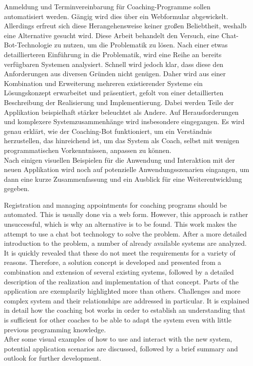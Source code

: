 \kurzfassung

Anmeldung und Terminvereinbarung für Coaching-Programme sollen automatisiert werden. Gängig wird dies über ein Webformular abgewickelt. Allerdings erfreut sich diese Herangehensweise keiner großen Beliebtheit, weshalb eine Alternative gesucht wird. Diese Arbeit behandelt den Versuch, eine Chat-Bot-Technologie zu nutzen, um die Problematik zu lösen. Nach einer etwas detaillierteren Einführung in die Problematik, wird eine Reihe an bereits verfügbaren Systemen analysiert. Schnell wird jedoch klar, dass diese den Anforderungen aus diversen Gründen nicht genügen. Daher wird aus einer Kombination und Erweiterung mehreren existierender Systeme ein Lösungskonzept erwarbeitet und präsentiert, gefolt von einer detaillierten Beschreibung der Realisierung und Implementierung. Dabei werden Teile der Applikation beispielhaft stärker beleuchtet als Andere. Auf Herausforderungen und komplexere Systemzusammenhänge wird insbesondere eingegangen. Es wird genau erklärt, wie der Coaching-Bot funktioniert, um ein Verständnis herzustellen, das hinreichend ist, um das System als Coach, selbst mit wenigen programmatischen Vorkenntnissen, anpassen zu können. \\
Nach einigen visuellen Beispielen für die Anwendung und Interaktion mit der neuen Applikation wird noch auf potenzielle Anwendungsszenarien eingangen, um dann eine kurze Zusammenfassung und ein Ausblick für eine Weiterentwicklung gegeben. 

\kurzfassungEN

Registration and managing appointments for coaching programs should be automated. This is usually done via a web form. However, this approach is rather unsuccessful, which is why an alternative is to be found. This work makes the attempt to use a chat bot technology to solve the problem. After a more detailed introduction to the problem, a number of already available systems are analyzed. It is quickly revealed that these do not meet the requirements for a variety of reasons. Therefore, a solution concept is developed and presented from a combination and extension of several existing systems, followed by a detailed description of the realization and implementation of that concept. Parts of the application are exemplarily highlighted more than others. Challenges and more complex system and their relationships are addressed in particular. It is explained in detail how the coaching bot works in order to establish an understanding that is sufficient for other coaches to be able to adapt the system even with little previous programming knowledge. \\
After some visual examples of how to use and interact with the new system, potential application scenarios are discussed, followed by a brief summary and outlook for further development. 
